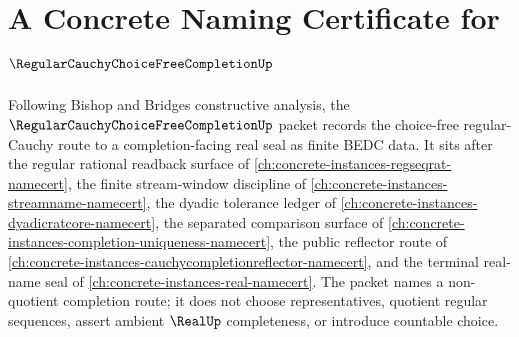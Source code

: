 \chapter{A Concrete Naming Certificate for $\RegularCauchyChoiceFreeCompletionUp$}
\label{ch:concrete-instances-regular-cauchy-choice-free-completion-namecert}

Following Bishop and Bridges constructive analysis, the $\RegularCauchyChoiceFreeCompletionUp$ packet records the choice-free regular-Cauchy route to a completion-facing real seal as finite BEDC data. It sits after the regular rational readback surface of \autoref{ch:concrete-instances-regseqrat-namecert}, the finite stream-window discipline of \autoref{ch:concrete-instances-streamname-namecert}, the dyadic tolerance ledger of \autoref{ch:concrete-instances-dyadicratcore-namecert}, the separated comparison surface of \autoref{ch:concrete-instances-completion-uniqueness-namecert}, the public reflector route of \autoref{ch:concrete-instances-cauchycompletionreflector-namecert}, and the terminal real-name seal of \autoref{ch:concrete-instances-real-namecert}. The packet names a non-quotient completion route; it does not choose representatives, quotient regular sequences, assert ambient $\RealUp$ completeness, or introduce countable choice.

